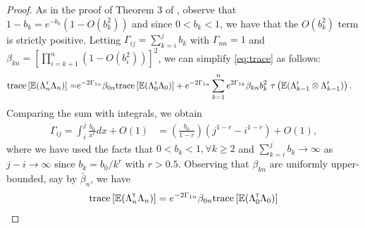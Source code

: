 \begin{proof}
As in the proof of Theorem 3 of \cite{spall-jacobian}, observe that $1-b_k = e^{-b_k}(1-O(b_k^2))$ and since $0 < b_k <1$, we have that the $O(b_k^2)$ term is strictly positive. 
Letting $\Gamma_{ij} = \sum_{k=i}^j b_k$ with $\Gamma_{nn} = 1$ and $\beta_{kn} = \left[\prod_{i=k+1}^n (1- O(b_i^2))\right]^2$, we can simplify \eqref{eq:trace} as follows:
\begin{align}\label{eq:wij}
 \text{trace} \left[\mathbb{E} (\Lambda_n ^\mathsf{\scriptscriptstyle T} \Lambda_n)\right] = &e^{-2 \Gamma_{1n}} \beta_{0n} \text{trace} \left[\mathbb{E} (\Lambda_0 ^\mathsf{\scriptscriptstyle T} \Lambda_0)\right]  + e^{-2 \Gamma_{1n}} \sum_{k=1}^n e^{2 \Gamma_{1k}} \beta_{kn} b_k^2  \,\,\tau\left(\mathbb{E} (\Lambda_{k-1}' \otimes \Lambda_{k-1}')\right).
 \end{align} 
Comparing the sum with integrals, we obtain
\begin{align*}
\Gamma_{ij} = \int_i^j \frac{b_0}{x^r} dx + O(1) &= \left(\frac{b_0}{1-r}\right)(j^{1-r}-i^{1-r}) +O(1),
\end{align*}
where we have used the facts that $0 < b_k < 1, \forall k \ge 2$ and 
$\sum_{k=i}^j b_k \to \infty$ as $j-i \to \infty$ since 
$b_k = b_0/k^r$ with $r > 0.5$.
Observing that $\beta_{kn}$ are uniformly upper-bounded, say by $\bar \beta_n$, we have
\begin{align}\label{eq:thmwts}
 & \text{trace} \left[\E (\Lambda_n \tr \Lambda_n)\right] =  e^{-2 \Gamma_{1n}} \beta_{0n} \text{trace} \left[\E (\Lambda_0 \tr \Lambda_0)\right]  \nonumber\\ 

\end{align}
\end{proof}
